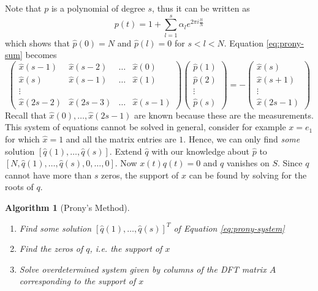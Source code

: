 \documentclass[10pt,a4paper]{article}
\theoremstyle{thmstyle}
\newtheorem{algorithm}{Algorithm}
\begin{document}
Note that $p$ is a polynomial of degree $s$, thus it can be written as
\begin{equation*}
  p(t) = 1 + \sum_{l = 1}^{s} \alpha_{l} e^{2\pi i \frac{lt}{N}}
\end{equation*}
which shows that $\hat{p}(0) = N$ and $\hat{p}(l) = 0$ for $s < l < N$.
Equation \eqref{eq:prony-sum} becomes
\begin{equation}
  \begin{pmatrix}
    \hat{x}(s - 1) & \hat{x}(s - 2) & \hdots & \hat{x}(0)\\
    \hat{x}(s) & \hat{x}(s - 1) & \hdots & \hat{x}(1)\\
    \vdots & & & \\
    \hat{x}(2s - 2) & \hat{x}(2s - 3) & \hdots & \hat{x}(s - 1)
  \end{pmatrix}
  \begin{pmatrix}
    \hat{p}(1)\\
    \hat{p}(2)\\
    \vdots\\
    \hat{p}(s)
  \end{pmatrix}
  =
  -\begin{pmatrix}
    \hat{x}(s)\\
    \hat{x}(s + 1)\\
    \vdots\\
    \hat{x}(2s - 1)
  \end{pmatrix}
  \label{eq:prony-system}
\end{equation}
Recall that $\hat{x}(0), \dots, \hat{x}(2s - 1)$ are known because these are the measurements.
This system of equations cannot be solved in general, consider for example $x = e_{1}$ for which $\hat{x} = 1$ and all the matrix entries are $1$.
Hence, we can only find \emph{some} solution $[\hat{q}(1), \dots, \hat{q}(s)]$.
Extend $\hat{q}$ with our knowledge about $\hat{p}$ to $[N, \hat{q}(1), \dots, \hat{q}(s), 0, \dots, 0]$.
Now $x(t)q(t) = 0$ and $q$ vanishes on $S$.
Since $q$ cannot have more than $s$ zeros, the support of $x$ can be found by solving for the roots of $q$.

\begin{algorithm}[Prony's Method]
  \begin{enumerate}
  \item Find some solution $[\hat{q}(1), \dots, \hat{q}(s)]^{T}$ of Equation \eqref{eq:prony-system}
  \item Find the zeros of $q$, i.e. the support of $x$
  \item Solve overdetermined system given by columns of the DFT matrix $A$ corresponding to the support of $x$
  \end{enumerate}
\end{algorithm}
\end{document}
